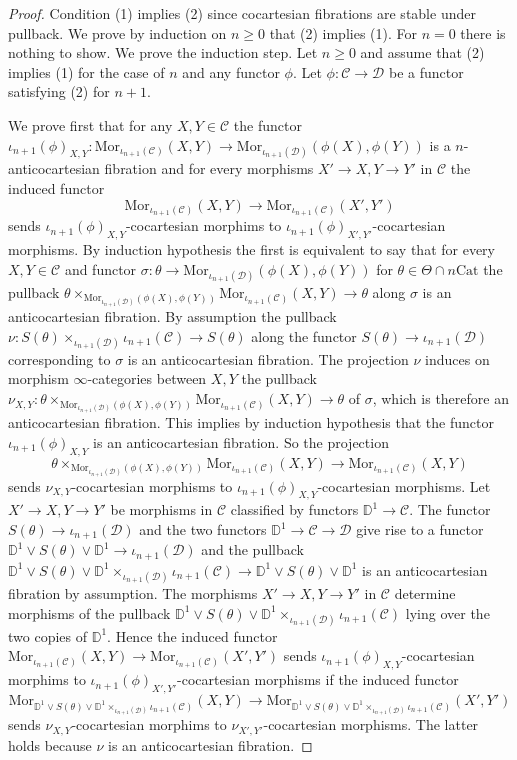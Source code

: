 \documentclass[10pt,oneside]{article}
\numberwithin{equation}{section} %
\numberwithin{figure}{section} %
\theoremstyle{plain}
\theoremstyle{definition}
\newcommand{\bD}{{\mathbb D}}
\newcommand{\mC}{{\mathcal C}}
\newcommand{\mD}{{\mathcal D}}
\newcommand{\Cat}{\mathrm{Cat}}
\newcommand{\Mor}{{\mathrm{Mor}}}
\begin{document}
\begin{proof}
Condition (1) implies (2) since cocartesian fibrations are stable under pullback.
We prove by induction on $n \geq 0$ that (2) implies (1).
For $n=0$ there is nothing to show.
We prove the induction step. Let $n \geq 0$ and assume that (2) implies (1) for the case of $n$ and any functor $\phi.$
Let $\phi: \mC \to \mD$ be a functor satisfying (2) for $n+1$.

We prove first that for any $X,Y \in \mC$ the functor
$\iota_{n+1}(\phi)_{X,Y}: \Mor_{\iota_{n+1}(\mC)}(X,Y) \to \Mor_{\iota_{n+1}(\mD)}(\phi(X), \phi(Y)) $
is a $n$-anticocartesian fibration and for every morphisms $X' \to X, Y \to Y'$ in $\mC$ the induced functor
\[
\Mor_{\iota_{n+1}(\mC)}(X,Y) \to \Mor_{\iota_{n+1}(\mC)}(X',Y')
\]
sends $\iota_{n+1}(\phi)_{X,Y}$-cocartesian morphims to $\iota_{n+1}(\phi)_{X',Y'}$-cocartesian morphisms.
By induction hypothesis the first is equivalent to say that
for every $X,Y \in \mC$ and functor $\sigma: \theta \to \Mor_{\iota_{n+1}(\mD)}(\phi(X), \phi(Y))$ for
$\theta \in \Theta \cap n\Cat$ the pullback $ \theta \times_{\Mor_{\iota_{n+1}(\mD)}(\phi(X), \phi(Y))} \Mor_{\iota_{n+1}(\mC)}(X,Y) \to \theta $ along $\sigma$ is an anticocartesian fibration.
By assumption the pullback $\nu: S(\theta) \times_{\iota_{n+1}(\mD)} \iota_{n+1}(\mC) \to S(\theta) $ along the functor
$S(\theta) \to \iota_{n+1}(\mD)$ corresponding to $\sigma $ is an anticocartesian fibration.
The projection $\nu $ induces on morphism $\infty$-categories between $X,Y$ the pullback $ \nu_{X,Y}: \theta \times_{\Mor_{\iota_{n+1}(\mD)}(\phi(X), \phi(Y))} \Mor_{\iota_{n+1}(\mC)}(X,Y) \to \theta $ of $\sigma$, which is therefore an anticocartesian fibration.
This implies by induction hypothesis that the functor
$\iota_{n+1}(\phi)_{X,Y}$ is an anticocartesian fibration. So the projection
$$ \theta \times_{\Mor_{\iota_{n+1}(\mD)}(\phi(X), \phi(Y))} \Mor_{\iota_{n+1}(\mC)}(X,Y) \to \Mor_{\iota_{n+1}(\mC)}(X,Y)$$ sends $\nu_{X,Y}$-cocartesian morphisms to $\iota_{n+1}(\phi)_{X,Y}$-cocartesian morphisms.
Let $X' \to X, Y \to Y' $ be morphisms in $\mC$ classified by functors
$\bD^1 \to \mC $.
The functor $S(\theta) \to \iota_{n+1}(\mD) $ and the two functors $\bD^1 \to \mC \to \mD$ give rise to a functor $\bD^1 \vee S(\theta) \vee \bD^1 \to  \iota_{n+1}(\mD) $ and the pullback $ \bD^1 \vee S(\theta) \vee \bD^1 \times_{ \iota_{n+1}(\mD)} \iota_{n+1}(\mC) \to \bD^1 \vee S(\theta) \vee \bD^1 $ is an anticocartesian fibration by assumption. The morphisms $X' \to X, Y \to Y'$ in $\mC$
determine morphisms of the pullback $ \bD^1 \vee S(\theta) \vee \bD^1 \times_{ \iota_{n+1}(\mD)} \iota_{n+1}(\mC) $ lying over the two copies of $\bD^1$.
Hence the induced functor
$\Mor_{\iota_{n+1}(\mC)}(X,Y) \to \Mor_{\iota_{n+1}(\mC)}(X',Y')$ sends $\iota_{n+1}(\phi)_{X,Y}$-cocartesian morphims to $\iota_{n+1}(\phi)_{X',Y'}$-cocartesian morphisms if the induced functor
$$\Mor_{\bD^1 \vee S(\theta) \vee \bD^1 \times_{ \iota_{n+1}(\mD)} \iota_{n+1}(\mC)}(X,Y) \to \Mor_{\bD^1 \vee S(\theta) \vee \bD^1 \times_{ \iota_{n+1}(\mD)} \iota_{n+1}(\mC)}(X',Y')$$ sends $\nu_{X,Y}$-cocartesian morphims to $\nu_{X',Y'}$-cocartesian morphisms.
The latter holds because $\nu$ is an anticocartesian fibration.



\end{proof}
\end{document}
